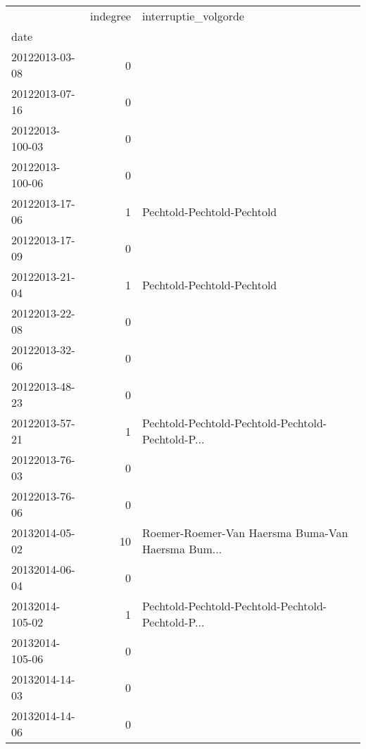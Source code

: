 \begin{tabular}{lrl}
\toprule
{} &  indegree &                               interruptie\_volgorde \\
date            &           &                                                    \\
\midrule
20122013-03-08  &         0 &                                                    \\
20122013-07-16  &         0 &                                                    \\
20122013-100-03 &         0 &                                                    \\
20122013-100-06 &         0 &                                                    \\
20122013-17-06  &         1 &                         Pechtold-Pechtold-Pechtold \\
20122013-17-09  &         0 &                                                    \\
20122013-21-04  &         1 &                         Pechtold-Pechtold-Pechtold \\
20122013-22-08  &         0 &                                                    \\
20122013-32-06  &         0 &                                                    \\
20122013-48-23  &         0 &                                                    \\
20122013-57-21  &         1 &  Pechtold-Pechtold-Pechtold-Pechtold-Pechtold-P... \\
20122013-76-03  &         0 &                                                    \\
20122013-76-06  &         0 &                                                    \\
20132014-05-02  &        10 &  Roemer-Roemer-Van Haersma Buma-Van Haersma Bum... \\
20132014-06-04  &         0 &                                                    \\
20132014-105-02 &         1 &  Pechtold-Pechtold-Pechtold-Pechtold-Pechtold-P... \\
20132014-105-06 &         0 &                                                    \\
20132014-14-03  &         0 &                                                    \\
20132014-14-06  &         0 &                                                    \\

\end{tabular}
